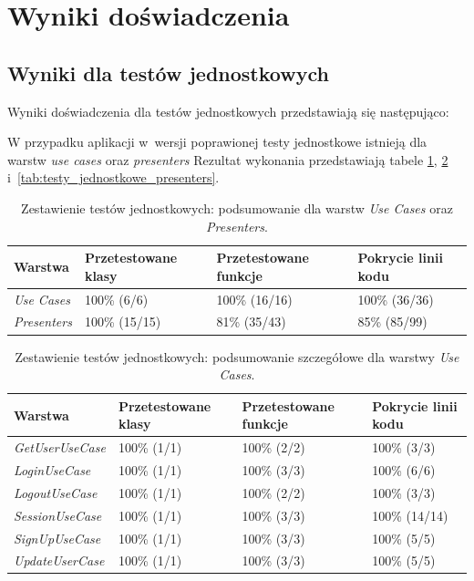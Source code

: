 \section{Wyniki doświadczenia}
\label{wyniki_doswiadczenia}
\subsection{Wyniki dla testów jednostkowych}
Wyniki doświadczenia dla testów jednostkowych przedstawiają się następująco:

W przypadku aplikacji w~wersji poprawionej testy jednostkowe istnieją dla warstw \textit{use cases} oraz \textit{presenters} Rezultat wykonania przedstawiają tabele \ref{tab:testy_jednostkowe_razem}, \ref{tab:testy_jednostkowe_usecases} i~\ref{tab:testy_jednostkowe_presenters}.
\begin{table}[!htb]
\centering
\caption{Zestawienie testów jednostkowych: podsumowanie dla warstw \textit{Use Cases} oraz \textit{Presenters}.}
\label{tab:testy_jednostkowe_razem}
\begin{tabular}{|l|l|l|l|}
\hline
\textbf{Warstwa} & \textbf{Przetestowane klasy} & \textbf{Przetestowane funkcje} & \textbf{Pokrycie linii kodu} \\ \hline
\textit{Use Cases} & 100\% (6/6) & 100\% (16/16) & 100\% (36/36)	\\ \hline
\textit{Presenters} & 100\% (15/15)	& 81\% (35/43) & 85\% (85/99) \\ \hline
\end{tabular}
\end{table}

\begin{table}[!htb]
\centering
\caption{Zestawienie testów jednostkowych: podsumowanie szczegółowe dla warstwy \textit{Use Cases}.}
\label{tab:testy_jednostkowe_usecases}
\begin{tabular}{|l|l|l|l|}
\hline
\textbf{Warstwa} & \textbf{Przetestowane klasy} & \textbf{Przetestowane funkcje} & \textbf{Pokrycie linii kodu} \\ \hline
\textit{GetUserUseCase} & 100\% (1/1) & 100\% (2/2) & 100\% (3/3)	\\ \hline
\textit{LoginUseCase} & 100\% (1/1) & 100\% (3/3) & 100\% (6/6)	\\ \hline
\textit{LogoutUseCase} & 100\% (1/1) & 100\% (2/2) & 100\% (3/3)	\\ \hline
\textit{SessionUseCase} & 100\% (1/1) & 100\% (3/3) & 100\% (14/14)	\\ \hline
\textit{SignUpUseCase} & 100\% (1/1) & 100\% (3/3) & 100\% (5/5)	\\ \hline
\textit{UpdateUserCase} & 100\% (1/1) & 100\% (3/3) & 100\% (5/5)	\\ \hline
\end{tabular}
\end{table}

